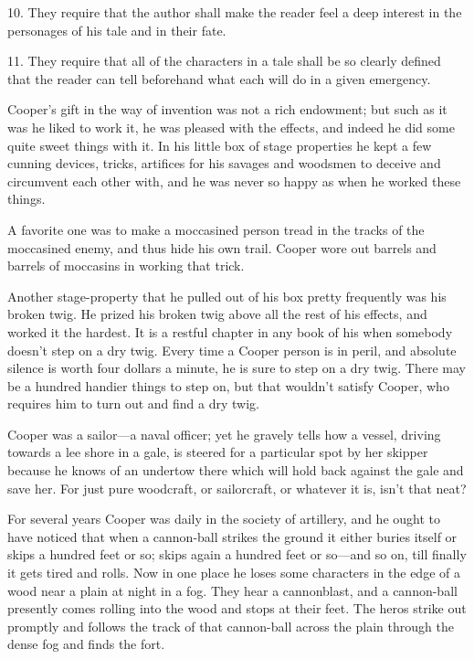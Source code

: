 \documentclass[../../demo.tex]{novelettesubdoc}
\begin{document}
10. They require that the author shall make the reader feel a deep
interest in the personages of his tale and in their fate.

11. They require that all of the characters in a tale shall be so
clearly defined that the reader can tell beforehand what each will do in a
given emergency.

Cooper's gift in the way of invention was not a rich endowment; but
such as it was he liked to work it, he was pleased with the effects,
and indeed he did some quite sweet things with it. In his little box of
stage properties he kept a few cunning devices, tricks, artifices
for his savages and woodsmen to deceive and circumvent each other with,
and he was never so happy as when he worked these things.

A favorite one was to make a moccasined person tread
in the tracks of the moccasined enemy, and thus hide his own trail.
Cooper wore out barrels and barrels of moccasins in working that trick.

Another stage-property that he pulled out of his box pretty frequently
was his broken twig. He prized his broken twig above all the rest of his
effects, and worked it the hardest. It is a restful chapter in any book
of his when somebody doesn't step on a dry twig. Every time a Cooper person is
in peril, and absolute silence is worth four dollars a minute, he is
sure to step on a dry twig. There may be a hundred handier things to
step on, but that wouldn't satisfy Cooper, who requires him to turn
out and find a dry twig.

Cooper was a sailor---a naval officer; yet he gravely tells how
a vessel, driving towards a lee shore in a gale, is steered for a
particular spot by her skipper because he knows of an undertow there
which will hold back against the gale and save her. For just pure
woodcraft, or sailorcraft, or whatever it is, isn't that neat?

For several years Cooper was daily in the society of artillery,
and he ought to have noticed that when a cannon-ball strikes the ground it
either buries itself or skips a hundred feet or so; skips again a hundred feet
or so---and so on, till finally it gets tired and rolls. Now in one place
he loses some characters in the edge of a wood
near a plain at night in a fog. They hear a cannonblast, and a
cannon-ball presently comes rolling into the wood and stops at their
feet. The heros strike out promptly and follows the track of that cannon-ball
across the plain through the dense fog and finds the fort.
\end{document}
